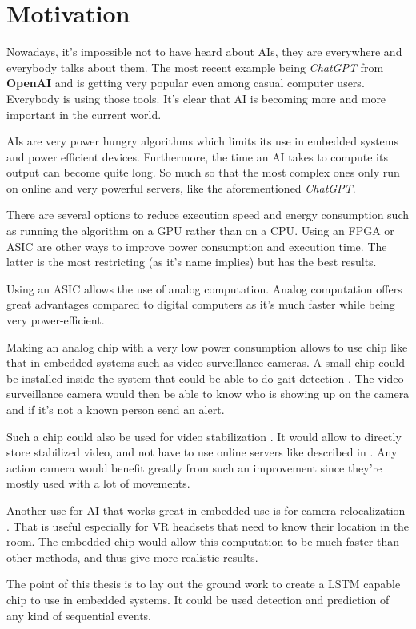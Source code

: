 \section{Motivation}
\label{sec:int_motivation}

Nowadays, it's impossible not to have heard about \acp{AI}, they are everywhere and everybody talks about them. The most recent example being \textit{ChatGPT} from \textbf{OpenAI} and is getting very popular even among casual computer users. Everybody is using those tools. It's clear that \ac{AI} is becoming more and more important in the current world.

\acp{AI} are very power hungry algorithms which limits its use in embedded systems and power efficient devices.
Furthermore, the time an \ac{AI} takes to compute its output can become quite long. So much so that the most complex ones only run on online and very powerful servers, like the aforementioned \textit{ChatGPT}.

There are several options to reduce execution speed and energy consumption such as running the algorithm on a \ac{GPU} rather than on a \ac{CPU}. Using an \ac{FPGA} or \ac{ASIC} are other ways to improve power consumption and execution time.
The latter is the most restricting (as it's name implies) but has the best results.

Using an \ac{ASIC} allows the use of analog computation. Analog computation offers great advantages compared to digital computers as it's much faster while being very power-efficient.

Making an analog chip with a very low power consumption allows to use chip like that in embedded systems such as video surveillance cameras. A small chip could be installed inside the system that could be able to do gait detection \cite{gaitDS,gaitDig,gait}. The video surveillance camera would then be able to know who is showing up on the camera and if it's not a known person send an alert.

Such a chip could also be used for video stabilization \cite{videoStab}. It would allow to directly store stabilized video, and not have to use online servers like described in \cite{videoStab}. Any action camera would benefit greatly from such an improvement since they're mostly used with a lot of movements.

Another use for \ac{AI} that works great in embedded use is for camera relocalization \cite{videoReloc}. That is useful especially for VR headsets that need to know their location in the room. The embedded chip would allow this computation to be much faster than other methods, and thus give more realistic results.


The point of this thesis is to lay out the ground work to create a LSTM capable chip to use in embedded systems. It could be used detection and prediction of any kind of sequential events.
